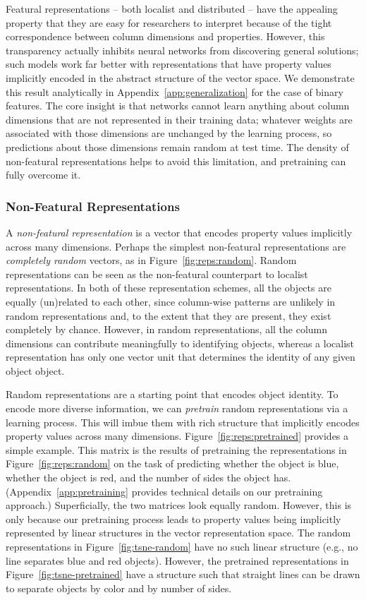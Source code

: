 \documentclass{article}
\newcommand{\Figref}[1]{Figure~\ref{#1}}
\newcommand{\figref}[1]{Figure~\ref{#1}}
\newcommand{\Appref}[1]{Appendix~\ref{#1}}
\newcommand{\appref}[1]{Appendix~\ref{#1}}
\newcommand{\tech}[1]{\emph{#1}}
\begin{document}
Featural representations -- both localist and distributed -- have the appealing property that they are easy for researchers to interpret because of the tight correspondence between column dimensions and properties. However, this transparency actually inhibits neural networks from discovering general solutions; such models work far better with representations that have property values implicitly encoded in the abstract structure of the vector space. We demonstrate this result analytically in \appref{app:generalization} for the case of binary features. The core insight is that networks cannot learn anything about column dimensions that are not represented in their training data; whatever weights are associated with those dimensions are unchanged by the learning process, so predictions about those dimensions remain random at test time. The density of non-featural representations helps to avoid this limitation, and pretraining can fully overcome it.

\subsubsection{Non-Featural Representations}

A \tech{non-featural representation} is a vector that encodes property values implicitly across many dimensions. Perhaps the simplest non-featural representations are \tech{completely random} vectors, as in \figref{fig:reps:random}. Random representations can be seen as the non-featural counterpart to localist representations. In both of these representation schemes, all the objects are equally (un)related to each other, since column-wise patterns are unlikely in random representations and, to the extent that they are present, they exist completely by chance. However, in random representations, all the column dimensions can contribute meaningfully to identifying objects, whereas a localist representation has only one vector unit that determines the identity of any given object object.

Random representations are a starting point that encodes object identity. To encode more diverse information, we can \tech{pretrain} random representations via a learning process. This will imbue them with rich structure that implicitly encodes property values across many dimensions. \Figref{fig:reps:pretrained} provides a simple example. This matrix is the results of pretraining the representations in \figref{fig:reps:random} on the task of predicting whether the object is blue, whether the object is red, and the number of sides the object has. (\Appref{app:pretraining} provides technical details on our pretraining approach.) Superficially, the two matrices look equally random. However, this is only because our pretraining process leads to property values being implicitly represented by linear structures in the vector representation space. The random representations in \figref{fig:tsne-random} have no such linear structure (e.g., no line separates blue and red objects). However, the pretrained representations in \figref{fig:tsne-pretrained} have a structure such that straight lines can be drawn to separate objects by color and by number of sides.
\end{document}
